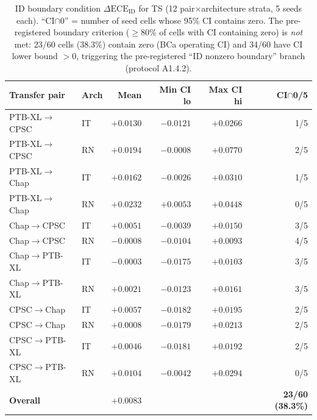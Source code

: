 \documentclass[review,12pt,nonatbib]{elsarticle}
\begin{document}
\begin{table}[t]
\centering
\caption{ID boundary condition $\Delta\text{ECE}_{\text{ID}}$ for TS
(12 pair$\times$architecture strata, 5 seeds each). ``CI$\cap$0'' =
number of seed cells whose 95\% CI contains zero. The pre-registered
boundary criterion ($\geq$80\% of cells with CI containing zero) is
\emph{not} met: 23/60 cells (38.3\%) contain zero (BCa operating CI)
and 34/60 have CI lower bound $>0$, triggering the pre-registered
``ID nonzero boundary'' branch (protocol A1.4.2).}
\label{tab:boundary}
\footnotesize
\begin{tabular}{llrrrr}
\toprule
Transfer pair & Arch & Mean & Min CI lo & Max CI hi & CI$\cap$0/5 \\
\midrule
PTB-XL$\rightarrow$CPSC   & IT & $+0.0130$ & $-0.0121$ & $+0.0266$ & 1/5 \\
PTB-XL$\rightarrow$CPSC   & RN & $+0.0194$ & $-0.0008$ & $+0.0770$ & 2/5 \\
PTB-XL$\rightarrow$Chap   & IT & $+0.0162$ & $-0.0026$ & $+0.0310$ & 1/5 \\
PTB-XL$\rightarrow$Chap   & RN & $+0.0232$ & $+0.0053$ & $+0.0448$ & 0/5 \\
Chap$\rightarrow$CPSC     & IT & $+0.0051$ & $-0.0039$ & $+0.0150$ & 3/5 \\
Chap$\rightarrow$CPSC     & RN & $-0.0008$ & $-0.0104$ & $+0.0093$ & 4/5 \\
Chap$\rightarrow$PTB-XL   & IT & $-0.0003$ & $-0.0175$ & $+0.0103$ & 3/5 \\
Chap$\rightarrow$PTB-XL   & RN & $+0.0021$ & $-0.0123$ & $+0.0161$ & 3/5 \\
CPSC$\rightarrow$Chap     & IT & $+0.0057$ & $-0.0182$ & $+0.0195$ & 2/5 \\
CPSC$\rightarrow$Chap     & RN & $+0.0008$ & $-0.0179$ & $+0.0213$ & 2/5 \\
CPSC$\rightarrow$PTB-XL   & IT & $+0.0046$ & $-0.0181$ & $+0.0192$ & 2/5 \\
CPSC$\rightarrow$PTB-XL   & RN & $+0.0104$ & $-0.0042$ & $+0.0294$ & 0/5 \\
\midrule
\textbf{Overall} & & $\mathbf{+0.0083}$ & & & \textbf{23/60 (38.3\%)} \\
\bottomrule
\end{tabular}
\end{table}
\end{document}
